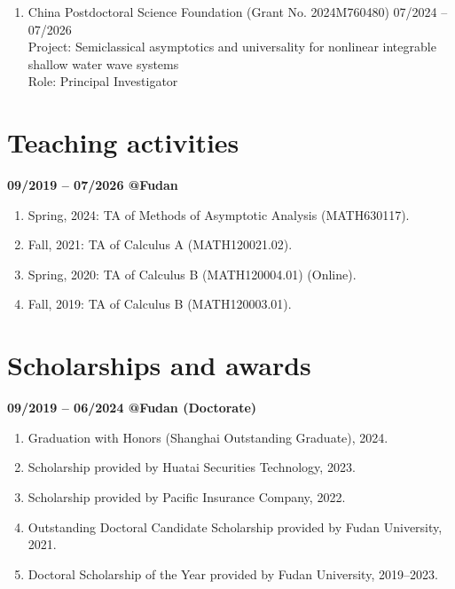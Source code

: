 \documentclass[margin]{res}
\begin{document}
\begin{resume}
\begin{enumerate}[--]
\item China Postdoctoral Science Foundation (Grant No. 2024M760480)  \hfill 07/2024 -- 07/2026\\
Project: Semiclassical asymptotics and universality for nonlinear integrable shallow water wave systems \\
Role: Principal Investigator
\end{enumerate}



\section{Teaching activities}
\textbf{09/2019 -- 07/2026 @Fudan}
\begin{enumerate}[--]
\item Spring, 2024: TA of Methods of Asymptotic Analysis (MATH630117).
\item Fall, 2021: TA of Calculus A (MATH120021.02).
\item Spring, 2020: TA of Calculus B (MATH120004.01) (Online).
\item Fall, 2019: TA of Calculus B (MATH120003.01).
\end{enumerate}


\section{Scholarships and awards}
\textbf{09/2019 -- 06/2024 @Fudan (Doctorate)}
\begin{enumerate}[--]
    \item Graduation with Honors (Shanghai Outstanding Graduate), 2024.
    \item Scholarship provided by Huatai Securities Technology, 2023.
    \item Scholarship provided by Pacific Insurance Company, 2022. 
    \item Outstanding Doctoral Candidate Scholarship provided by Fudan University, 2021. 
    \item Doctoral Scholarship of the Year provided by Fudan University, 2019--2023. 
\end{enumerate}


\end{resume}
\end{document}
